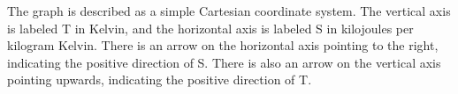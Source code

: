 The graph is described as a simple Cartesian coordinate system. The vertical axis is labeled T in Kelvin, and the horizontal axis is labeled S in kilojoules per kilogram Kelvin. There is an arrow on the horizontal axis pointing to the right, indicating the positive direction of S. There is also an arrow on the vertical axis pointing upwards, indicating the positive direction of T.